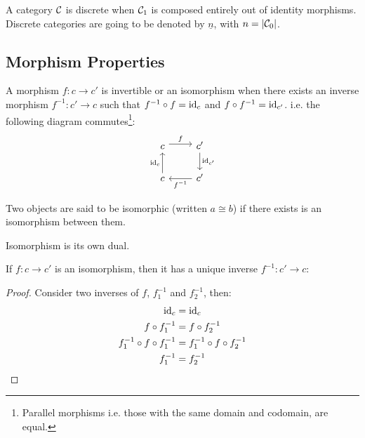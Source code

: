 \begin{definition}
  A category $\mathcal{C}$ is discrete when $\mathcal{C}_1$ is composed entirely out of identity
  morphisms. \parencite{awodey:category_theory} Discrete categories are going to
  be denoted by $\underline{n}$, with $n=|\mathcal{C}_0|$.
\end{definition}

\subsection{Morphism Properties}

\begin{definition}
  A morphism $f: c\to c'$ is invertible or an isomorphism when there exists an
  inverse morphism $f^{-1}:c'\to c$ such that $f^{-1}\circ f = \mathrm{id}_{c}$ and
  $f\circ f^{-1} = \mathrm{id}_{c'}$. \parencite{lane:working_mathematician} i.e. the
  following diagram commutes\footnote{Parallel morphisms i.e. those with the
  same domain and codomain, are equal.}:
  \[\begin{tikzcd}
    c & {c'} \\
    c & {c'}
    \arrow["f", shift left=1, from=1-1, to=1-2]
    \arrow["{f^{-1}}", from=2-2, to=2-1]
    \arrow["{\mathrm{id}_c}", from=2-1, to=1-1]
    \arrow["{\mathrm{id}_{c'}}", from=1-2, to=2-2]
  \end{tikzcd}\]
\end{definition}

\begin{remark}
  Two objects are said to be isomorphic (written $a\cong b$) if there exists is
  an isomorphism between them.
\end{remark}

\begin{remark}
  Isomorphism is its own dual.
\end{remark}

\begin{theorem}
  If $f: c\to c'$ is an isomorphism, then it has a unique inverse $f^{-1}:c'\to
  c$:

  \begin{proof}
    Consider two inverses of $f$, $f^{-1}_1$ and $f^{-1}_2$, then:
    \[
      \begin{aligned}
        \mathrm{id}_c &= \mathrm{id}_c\\
        f\circ f^{-1}_1 &= f\circ f^{-1}_2\\
        f^{-1}_1 \circ f \circ f^{-1}_1 &= f^{-1}_1 \circ f \circ f^{-1}_2\\
        f^{-1}_1 &= f^{-1}_2
      \end{aligned}
    \]
  \end{proof}
\end{theorem}


